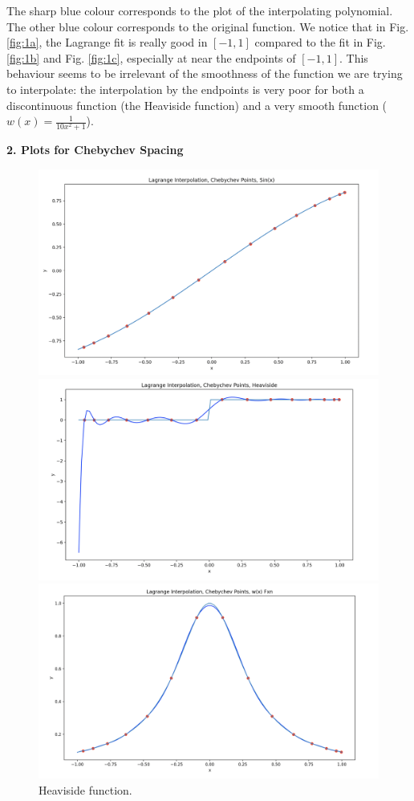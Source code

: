 \documentclass[11pt]{article}
\theoremstyle{definition}
\theoremstyle{theorem}
\begin{document}
The sharp blue colour corresponds to the plot of the interpolating polynomial. The other blue colour corresponds to the original function. We notice that in Fig. \ref{fig:1a}, the Lagrange fit is really good in \( [-1,1] \) compared to the fit in Fig. \ref{fig:1b} and Fig. \ref{fig:1c}, especially at near the endpoints of \( [-1,1] \). This behaviour seems to be irrelevant of the smoothness of the function we are trying to interpolate: the interpolation by the endpoints is very poor for both a discontinuous function (the Heaviside function) and a very smooth function (\( w(x) = \frac{1}{10x^2 +1} \)).

\textbf{2. Plots for Chebychev Spacing}
\begin{figure}[H]
  \includegraphics[width=\linewidth]{plots/2a.png}
  \caption{\( f(x) = \sin(x). \)}\label{fig:2a}
\endminipage\hfill
{}
  \includegraphics[width=\linewidth]{plots/2b.png}
  \caption{Heaviside function.}\label{fig:2b}
\endminipage\hfill
{}%
  \includegraphics[width=\linewidth]{plots/2c.png}

\end{figure}
\end{document}
